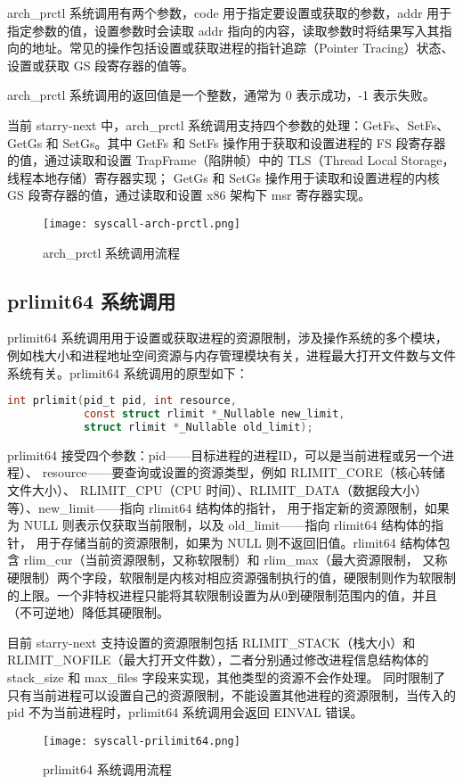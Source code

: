 arch\_prctl 系统调用有两个参数，code 用于指定要设置或获取的参数，addr 用于指定参数的值，设置参数时会读取 addr 指向的内容，读取参数时将结果写入其指向的地址。常见的操作包括设置或获取进程的指针追踪（Pointer Tracing）状态、设置或获取 GS 段寄存器的值等。

arch\_prctl 系统调用的返回值是一个整数，通常为 0 表示成功，-1 表示失败。

当前 starry-next 中，arch\_prctl 系统调用支持四个参数的处理：GetFs、SetFs、GetGs 和 SetGs。其中 GetFs 和 SetFs 操作用于获取和设置进程的 FS 段寄存器的值，通过读取和设置 TrapFrame（陷阱帧）中的 TLS（Thread Local Storage，线程本地存储）寄存器实现；
GetGs 和 SetGs 操作用于读取和设置进程的内核 GS 段寄存器的值，通过读取和设置 x86 架构下 msr 寄存器实现。

\begin{figure}[H]
    \centering
    \texttt{[image: syscall-arch-prctl.png]}
    \caption{arch\_prctl 系统调用流程}
    \label{fig:arch-prctl}
\end{figure}

\subsection{prlimit64 系统调用}

prlimit64 系统调用用于设置或获取进程的资源限制，涉及操作系统的多个模块，例如栈大小和进程地址空间资源与内存管理模块有关，进程最大打开文件数与文件系统有关。prlimit64 系统调用的原型如下：
\begin{lstlisting}[language=c, caption=prlimit64]
int prlimit(pid_t pid, int resource,
            const struct rlimit *_Nullable new_limit,
            struct rlimit *_Nullable old_limit);
\end{lstlisting}

prlimit64 接受四个参数：pid——目标进程的进程ID，可以是当前进程或另一个进程）、
resource——要查询或设置的资源类型，例如 RLIMIT\_CORE（核心转储文件大小）、
RLIMIT\_CPU（CPU 时间）、RLIMIT\_DATA（数据段大小）等）、new\_limit——指向 rlimit64 结构体的指针，
用于指定新的资源限制，如果为 NULL 则表示仅获取当前限制，以及 old\_limit——指向 rlimit64 结构体的指针，
用于存储当前的资源限制，如果为 NULL 则不返回旧值。rlimit64 结构体包含 rlim\_cur（当前资源限制，又称软限制）和 rlim\_max（最大资源限制，
又称硬限制）两个字段，软限制是内核对相应资源强制执行的值，硬限制则作为软限制的上限。一个非特权进程只能将其软限制设置为从0到硬限制范围内的值，并且（不可逆地）降低其硬限制。

目前 starry-next 支持设置的资源限制包括 RLIMIT\_STACK（栈大小）和 RLIMIT\_NOFILE（最大打开文件数），二者分别通过修改进程信息结构体的 stack\_size 和 max\_files 字段来实现，其他类型的资源不会作处理。
同时限制了只有当前进程可以设置自己的资源限制，不能设置其他进程的资源限制，当传入的 pid 不为当前进程时，prlimit64 系统调用会返回 EINVAL 错误。

\begin{figure}[H]
    \centering
    \texttt{[image: syscall-prilimit64.png]}
    \caption{prlimit64 系统调用流程}
    \label{fig:prlimit64}
\end{figure}
